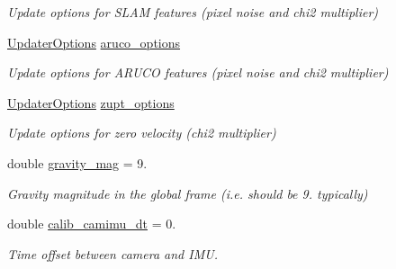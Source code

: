 \begin{DoxyCompactItemize}
\begin{DoxyCompactList}\small\item\em Update options for S\+L\+AM features (pixel noise and chi2 multiplier) \end{DoxyCompactList}\item 
\mbox{\label{structov__msckf_1_1VioManagerOptions_a7f72e601f8b772aeb3a59304fd615667}} 
\hyperlink{structov__msckf_1_1UpdaterOptions}{Updater\+Options} \hyperlink{structov__msckf_1_1VioManagerOptions_a7f72e601f8b772aeb3a59304fd615667}{aruco\+\_\+options}
\begin{DoxyCompactList}\small\item\em Update options for A\+R\+U\+CO features (pixel noise and chi2 multiplier) \end{DoxyCompactList}\item 
\mbox{\label{structov__msckf_1_1VioManagerOptions_adbcc99cae0410b2627246080e9e03e3e}} 
\hyperlink{structov__msckf_1_1UpdaterOptions}{Updater\+Options} \hyperlink{structov__msckf_1_1VioManagerOptions_adbcc99cae0410b2627246080e9e03e3e}{zupt\+\_\+options}
\begin{DoxyCompactList}\small\item\em Update options for zero velocity (chi2 multiplier) \end{DoxyCompactList}\item 
\mbox{\label{structov__msckf_1_1VioManagerOptions_a0ab368f8b306660cc0fd59790851b3eb}} 
double \hyperlink{structov__msckf_1_1VioManagerOptions_a0ab368f8b306660cc0fd59790851b3eb}{gravity\+\_\+mag} = 9.
\begin{DoxyCompactList}\small\item\em Gravity magnitude in the global frame (i.\+e. should be 9. typically) \end{DoxyCompactList}\item 
\mbox{\label{structov__msckf_1_1VioManagerOptions_a10bb45ab36e74b8e4d25f8e68bc2ffd7}} 
double \hyperlink{structov__msckf_1_1VioManagerOptions_a10bb45ab36e74b8e4d25f8e68bc2ffd7}{calib\+\_\+camimu\+\_\+dt} = 0.
\begin{DoxyCompactList}\small\item\em Time offset between camera and I\+MU. \end{DoxyCompactList}\item 

\end{DoxyCompactItemize}
